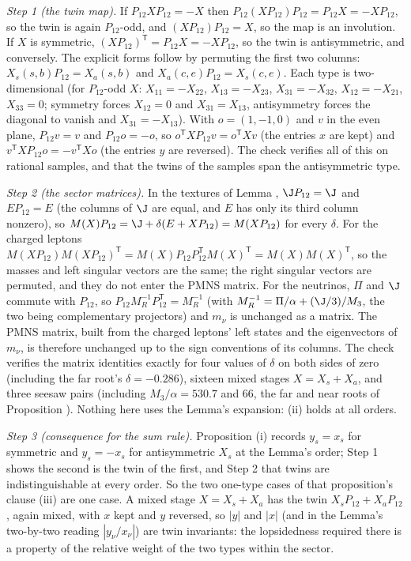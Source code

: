 \emph{Step 1 (the twin map).} If $P_{12}XP_{12} = -X$ then $P_{12}(XP_{12})P_{12} = P_{12}X = -XP_{12}$, so the twin is again $P_{12}$-odd, and $(XP_{12})P_{12} = X$, so the map is an involution. If $X$ is symmetric, $(XP_{12})^{\mathsf{T}} = P_{12}X = -XP_{12}$, so the twin is antisymmetric, and conversely. The explicit forms follow by permuting the first two columns: $X_{s}(s,b)P_{12} = X_{a}(s,b)$ and $X_{a}(c,e)P_{12} = X_{s}(c,e)$. Each type is two-dimensional (for $P_{12}$-odd $X$: $X_{11} = -X_{22}$, $X_{13} = -X_{23}$, $X_{31} = -X_{32}$, $X_{12} = -X_{21}$, $X_{33} = 0$; symmetry forces $X_{12} = 0$ and $X_{31} = X_{13}$, antisymmetry forces the diagonal to vanish and $X_{31} = -X_{13}$). With $o = (1,-1,0)$ and $v$ in the even plane, $P_{12}v = v$ and $P_{12}o = -o$, so $o^{\mathsf{T}}XP_{12}v = o^{\mathsf{T}}Xv$ (the entries $x$ are kept) and $v^{\mathsf{T}}XP_{12}o = -v^{\mathsf{T}}Xo$ (the entries $y$ are reversed). The check verifies all of this on rational samples, and that the twins of the samples span the antisymmetric type.

\emph{Step 2 (the sector matrices).} In the textures of Lemma , $\J P_{12} = \J$ and $EP_{12} = E$ (the columns of $\J$ are equal, and $E$ has only its third column nonzero), so $M(X)P_{12} = \J + \delta(E + XP_{12}) = M(XP_{12})$ for every $\delta$. For the charged leptons $M(XP_{12})M(XP_{12})^{\mathsf{T}} = M(X)P_{12}P_{12}^{\mathsf{T}}M(X)^{\mathsf{T}} = M(X)M(X)^{\mathsf{T}}$, so the masses and left singular vectors are the same; the right singular vectors are permuted, and they do not enter the PMNS matrix. For the neutrinos, $\Pi$ and $\J$ commute with $P_{12}$, so $P_{12}M_{R}^{-1}P_{12}^{\mathsf{T}} = M_{R}^{-1}$ (with $M_{R}^{-1} = \Pi/\alpha + (\J/3)/M_{3}$, the two being complementary projectors) and $m_{\nu}$ is unchanged as a matrix. The PMNS matrix, built from the charged leptons' left states and the eigenvectors of $m_{\nu}$, is therefore unchanged up to the sign conventions of its columns. The check verifies the matrix identities exactly for four values of $\delta$ on both sides of zero (including the far root's $\delta = -0.286$), sixteen mixed stages $X = X_{s} + X_{a}$, and three seesaw pairs (including $M_{3}/\alpha = 530.7$ and $66$, the far and near roots of Proposition ). Nothing here uses the Lemma's expansion: (ii) holds at all orders.

\emph{Step 3 (consequence for the sum rule).} Proposition (i) records $y_{s} = x_{s}$ for symmetric and $y_{s} = -x_{s}$ for antisymmetric $X_{s}$ at the Lemma's order; Step 1 shows the second is the twin of the first, and Step 2 that twins are indistinguishable at every order. So the two one-type cases of that proposition's clause (iii) are one case. A mixed stage $X = X_{s} + X_{a}$ has the twin $X_{s}P_{12} + X_{a}P_{12}$, again mixed, with $x$ kept and $y$ reversed, so $|y|$ and $|x|$ (and in the Lemma's two-by-two reading $|y_{\nu}/x_{\nu}|$) are twin invariants: the lopsidedness required there is a property of the relative weight of the two types within the sector.

